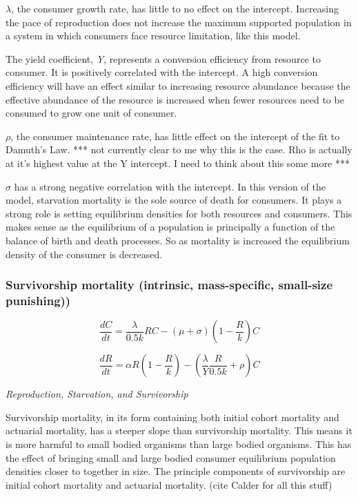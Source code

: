\documentclass[]{rsos}%
\begin{document}
$\lambda$, the consumer growth rate, has little to no effect on the intercept. Increasing the pace of reproduction does not increase the maximum supported population in a system in which consumers face resource limitation, like this model. 

The yield coefficient, \emph{Y}, represents a conversion efficiency from resource to consumer. It is positively correlated with the intercept. A high conversion efficiency will have an effect similar to increasing resource abundance because the effective abundance of the resource is increased when fewer resources need to be consumed to grow one unit of consumer.

$\rho$, the consumer maintenance rate, has little effect on the intercept of the fit to Damuth's Law. *** not currently clear to me why this is the case. Rho is actually at it's highest value at the Y intercept. I need to think about this some more  ***

$\sigma$ has a strong negative correlation with the intercept. In this version of the model, starvation mortality is the sole source of death for consumers. It plays a strong role is setting equilibrium densities for both resources and consumers. This makes sense as the equilibrium of a population is principally a function of the balance of birth and death processes. So as mortality is increased the equilibrium density of the consumer is decreased. \\
	
	
	

\subsubsection{Survivorship mortality (intrinsic, mass-specific, small-size punishing))}



\begin{equation}
    \frac{dC}{dt}= \frac{\lambda}{0.5k}RC- (\mu+\sigma)(1 - \frac{R}{k})C
\end{equation}

\vspace{0.5cm}

\begin{equation}
    \frac{dR}{dt} = \alpha R(1 - \frac{R}{k}) - (\frac{\lambda}{Y}\frac{R}{0.5k} + \rho)C
\end{equation}


\emph{Reproduction, Starvation, and Survivorship}

 Survivorship mortality, in its form containing both initial cohort mortality and actuarial mortality, has a steeper slope than survivorship mortality. This means it is more harmful to small bodied organisms than large bodied organisms. This has the effect of bringing small and large bodied consumer equilibrium population densities closer to together in size. The principle components of survivorship are initial cohort mortality and actuarial mortality. (cite Calder for all this stuff)\\
\end{document}
